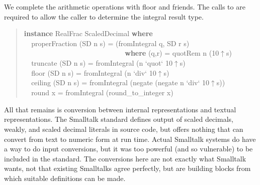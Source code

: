 \documentclass[prodmode,acmtoplas]{acmsmall}
\begin{document}
We complete the arithmetic operations with floor and friends.
The calls to  are required to allow the caller
to determine the integral result type.

\begin{quote}
\begin{tabbing}
\sffamily \textbf{instance} RealFrac ScaledDecimal \textbf{where}\\
\verb|  |\sffamily  properFraction (SD n s) = (fromIntegral q, SD r s)\\
\verb|                            |\sffamily                            \textbf{where} (q,r) = quotRem n (10$\uparrow$s)\\
\verb|  |\sffamily  truncate (SD n s) = fromIntegral (n `quot` 10$\uparrow$s)\\
\verb|  |\sffamily  floor    (SD n s) = fromIntegral (n `div`  10$\uparrow$s)\\
\verb|  |\sffamily  ceiling  (SD n s) = fromIntegral (negate (negate n `div` 10$\uparrow$s))\\
\verb|  |\sffamily  round x = fromIntegral (round\_to\_integer x)
\end{tabbing}
\end{quote}

All that remains is conversion between internal representations
and textual representations.  The Smalltalk standard defines
output of scaled decimals, weakly, and scaled decimal literals
in source code, but offers nothing that can convert from text
to numeric form at run time.  Actual Smalltalk systems do have
a way to do input conversions, but it was too powerful (and so
vulnerable) to be included in the standard.  The conversions here
are not exactly what Smalltalk wants, not that existing Smalltalks
agree perfectly, but are building blocks from which suitable
definitions can be made.
\end{document}

